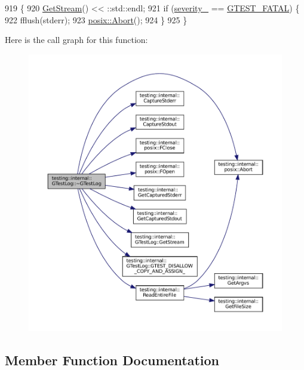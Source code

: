 \begin{DoxyCode}
919                     \{
920   \hyperlink{classtesting_1_1internal_1_1GTestLog_aebb92e67d98eca69f0347d5121dab27a}{GetStream}() << ::std::endl;
921   \textcolor{keywordflow}{if} (\hyperlink{classtesting_1_1internal_1_1GTestLog_ad8f75f5845900d0d2fd3cbb048a861be}{severity\_} == \hyperlink{namespacetesting_1_1internal_aa6255ef3b023c5b4e1a2198d887fb977a75063567740f6bf7da419b1b9197b12e}{GTEST\_FATAL}) \{
922     fflush(stderr);
923     \hyperlink{namespacetesting_1_1internal_1_1posix_a69b8278c59359dd6a6f941b4643db9fb}{posix::Abort}();
924   \}
925 \}
\end{DoxyCode}
Here is the call graph for this function\+:
\nopagebreak
\begin{figure}[H]
\begin{center}
\leavevmode
\includegraphics[width=350pt]{classtesting_1_1internal_1_1GTestLog_a978a099703bbaa0f380216e8d7ee03d3_cgraph}
\end{center}
\end{figure}


\subsection{Member Function Documentation}
\mbox{\label{classtesting_1_1internal_1_1GTestLog_aebb92e67d98eca69f0347d5121dab27a}} 
